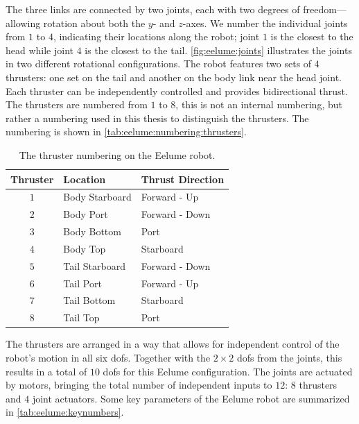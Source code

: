 The three links are connected by two joints, each with two degrees of freedom—
allowing rotation about both the $y$- and $z$-axes. We number the individual joints from
\(1\) to \(4\), indicating their locations along the robot; joint \(1\) is
the closest to the head while joint \(4\) is the closest to the tail.
\autoref{fig:eelume:joints} illustrates the joints in two different rotational configurations. The robot 
features two sets of $4$ thrusters: one set on the tail and another on the 
body link near the head joint. Each thruster can be independently controlled 
and provides bidirectional thrust. The thrusters are numbered from \(1\) to \(8\),
this is not an internal numbering, but rather a numbering used in this thesis
to distinguish the thrusters. The numbering is shown in \autoref{tab:eelume:numbering:thrusters}.
\begin{table}
    \centering
    \begin{tabular}{|c|l|l|}
        \hline
        Thruster & Location & Thrust Direction \\ \hline \hline
        \(1\) & Body Starboard & Forward - Up \\ \hline
        \(2\) & Body Port & Forward - Down \\ \hline
        \(3\) & Body Bottom & Port \\ \hline
        \(4\) & Body Top & Starboard \\ \hline
        \(5\) & Tail Starboard & Forward - Down \\ \hline
        \(6\) & Tail Port & Forward - Up \\ \hline
        \(7\) & Tail Bottom & Starboard \\ \hline
        \(8\) & Tail Top & Port  \\ \hline
        \hline
    \end{tabular}
    \caption{The thruster numbering on the Eelume robot.}
    \label{tab:eelume:numbering:thrusters}
\end{table}
The thrusters are arranged in a way that allows for independent control of
the robot's motion in all six \gls{dof}s.
Together with the $2 \times 2$ \gls{dof}s from the joints, this results in a 
total of $10$ \gls{dof}s for this Eelume configuration. The joints are 
actuated by motors, bringing the total number of independent inputs to $12$:
$8$ thrusters and $4$ joint actuators. Some key parameters of the Eelume robot
are summarized in \autoref{tab:eelume:keynumbers}.
